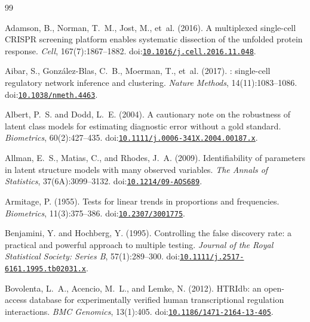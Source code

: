 \documentclass[11pt,a4paper]{article}
\begin{document}
\begin{thebibliography}{99}

Adamson, B., Norman, T.~M., Jost, M., et~al. (2016).
\newblock A multiplexed single-cell {CRISPR} screening platform enables systematic dissection of the unfolded protein response.
\newblock \emph{Cell}, 167(7):1867--1882.
\newblock doi:\href{https://doi.org/10.1016/j.cell.2016.11.048}{\nolinkurl{10.1016/j.cell.2016.11.048}}.

Aibar, S., Gonz{\'a}lez-Blas, C.~B., Moerman, T., et~al. (2017).
: single-cell regulatory network inference and clustering.
\newblock \emph{Nature Methods}, 14(11):1083--1086.
\newblock doi:\href{https://doi.org/10.1038/nmeth.4463}{\nolinkurl{10.1038/nmeth.4463}}.

Albert, P.~S. and Dodd, L.~E. (2004).
\newblock A cautionary note on the robustness of latent class models for estimating diagnostic error without a gold standard.
\newblock \emph{Biometrics}, 60(2):427--435.
\newblock doi:\href{https://doi.org/10.1111/j.0006-341X.2004.00187.x}{\nolinkurl{10.1111/j.0006-341X.2004.00187.x}}.

Allman, E.~S., Matias, C., and Rhodes, J.~A. (2009).
\newblock Identifiability of parameters in latent structure models with many observed variables.
\newblock \emph{The Annals of Statistics}, 37(6A):3099--3132.
\newblock doi:\href{https://doi.org/10.1214/09-AOS689}{\nolinkurl{10.1214/09-AOS689}}.

Armitage, P. (1955).
\newblock Tests for linear trends in proportions and frequencies.
\newblock \emph{Biometrics}, 11(3):375--386.
\newblock doi:\href{https://doi.org/10.2307/3001775}{\nolinkurl{10.2307/3001775}}.

Benjamini, Y. and Hochberg, Y. (1995).
\newblock Controlling the false discovery rate: a practical and powerful approach to multiple testing.
\newblock \emph{Journal of the Royal Statistical Society: Series B}, 57(1):289--300.
\newblock doi:\href{https://doi.org/10.1111/j.2517-6161.1995.tb02031.x}{\nolinkurl{10.1111/j.2517-6161.1995.tb02031.x}}.

Bovolenta, L.~A., Acencio, M.~L., and Lemke, N. (2012).
\newblock HTRIdb: an open-access database for experimentally verified human transcriptional regulation interactions.
\newblock \emph{BMC Genomics}, 13(1):405.
\newblock doi:\href{https://doi.org/10.1186/1471-2164-13-405}{\nolinkurl{10.1186/1471-2164-13-405}}.


\end{thebibliography}
\end{document}

